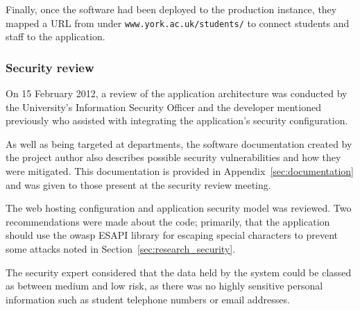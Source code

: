 Finally, once the software had been deployed to the production instance, they
mapped a URL from under \texttt{www.york.ac.uk/students/} to connect students
and staff to the application.

\subsubsection{Security review}

On 15 February 2012, a review of the application architecture was conducted by
the University's Information Security Officer and the developer mentioned
previously who assisted with integrating the application's security
configuration.

As well as being targeted at departments, the software documentation created
by the project author also describes possible security vulnerabilities and how
they were mitigated. This documentation is provided in
Appendix~\ref{sec:documentation} and was given to those present at the
security review meeting.

The web hosting configuration and application security model was reviewed. Two
recommendations were made about the code; primarily, that the application
should use the \gls{owasp} ESAPI library for escaping special characters to
prevent some attacks noted in Section~\ref{sec:research_security}.

The security expert considered that the data held by the system could be
classed as between medium and low risk, as there was no highly sensitive
personal information such as student telephone numbers or email addresses.
